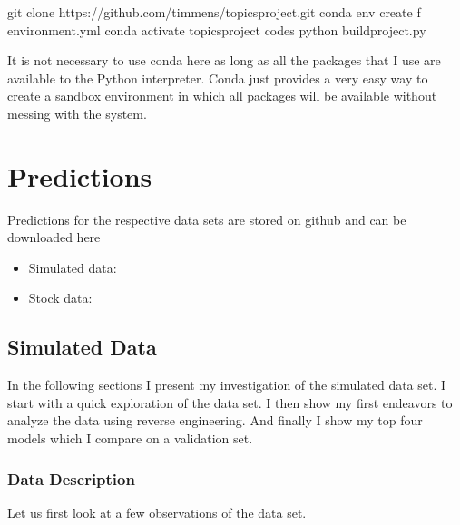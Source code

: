 \documentclass[letterpaper,10pt,english]{sphinxmanual}
\begin{document}
\begin{sphinxVerbatim}[commandchars=\\\{\}]
 git clone https://github.com/timmens/topics\PYGZhy{}project.git
 conda env create \PYGZhy{}f environment.yml
 conda activate topics\PYGZhy{}project
  codes
 python build\PYGZus{}project.py
\end{sphinxVerbatim}

It is not necessary to use conda here as long as all the packages that I use are available to the Python interpreter. Conda just provides a very easy way to create a sandbox environment in which all packages will be available without messing with the system.


\chapter{Predictions}
\label{\detokenize{intro:predictions}}
Predictions for the respective data sets are stored on github and can be downloaded here
\begin{itemize}
\item {} 
Simulated data: 

\item {} 
Stock data: 

\end{itemize}


\section{Simulated Data}
\label{\detokenize{simulated:simulated-data}}\label{\detokenize{simulated::doc}}
In the following sections I present my investigation of the simulated data set.
I start with a quick exploration of the data set.
I then show my first endeavors to analyze the data using reverse engineering.
And finally I show my top four models which I compare on a validation set.


\subsection{Data Description}
\label{\detokenize{simulated_intro:data-description}}\label{\detokenize{simulated_intro::doc}}
Let us first look at a few observations of the data set.
\end{document}
